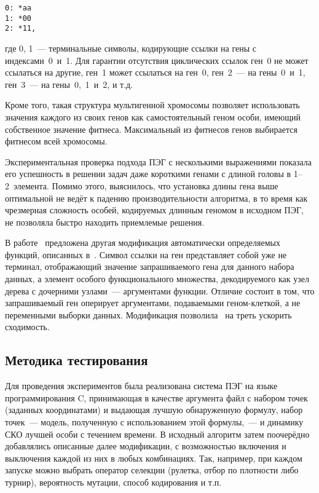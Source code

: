 \begin{samepage}
\begin{verbatim}
0: *aa
1: *00
2: *11,
\end{verbatim}
\end{samepage}

где 0, 1~--- терминальные символы, кодирующие ссылки на гены с индексами~0~и~1. Для гарантии отсутствия циклических ссылок ген~0 не может ссылаться на другие, ген~1 может ссылаться на ген~0, ген~2~--- на гены~0~и~1, ген~3~--- на гены~0,~1~и~2, и т.д.

Кроме того, такая структура мультигенной хромосомы позволяет использовать значения каждого из своих генов как самостоятельный геном особи, имеющий собственное значение фитнеса. Максимальный из фитнесов генов выбирается фитнесом всей хромосомы.

Экспериментальная проверка подхода ПЭГ с несколькими выражениями показала его успешность в решении задач даже короткими генами с длиной головы в 1--2~элемента. Помимо этого, выяснилось, что установка длины гена выше оптимальной не ведёт к падению производительности алгоритма, в то время как чрезмерная сложность особей, кодируемых длинным геномом в исходном ПЭГ, не позволяла быстро находить приемлемые решения.

В работе~\cite{Li:2008:GNF:1473248.1474006} предложена другая модификация автоматически определяемых функций, описанных в~\cite{Ferreira:2006:GSP}. Символ ссылки на ген представляет собой уже не терминал, отображающий значение запрашиваемого гена для данного набора данных, а элемент особого функционального множества, декодируемого как узел дерева с дочерними узлами~--- аргументами функции. Отличие состоит в том, что запрашиваемый ген оперирует аргументами, подаваемыми геном-клеткой, а не переменными выборки данных. Модификация позволила~\cite{Li:2008:GNF:1473248.1474006} на треть ускорить сходимость.





\subsection{Методика тестирования}

Для проведения экспериментов была реализована система ПЭГ на языке программирования C, принимающая в качестве аргумента файл с набором точек (заданных координатами) и выдающая лучшую обнаруженную формулу, набор точек~--- модель, полученную с использованием этой формулы,~--- и динамику СКО лучшей особи с течением времени. В исходный алгоритм затем поочерёдно добавлялись описанные далее модификации, с возможностью включения и выключения каждой из них в любых комбинациях.  Так, например, при каждом запуске можно выбрать оператор селекции (рулетка, отбор по плотности либо турнир), вероятность мутации, способ кодирования и т.п.


